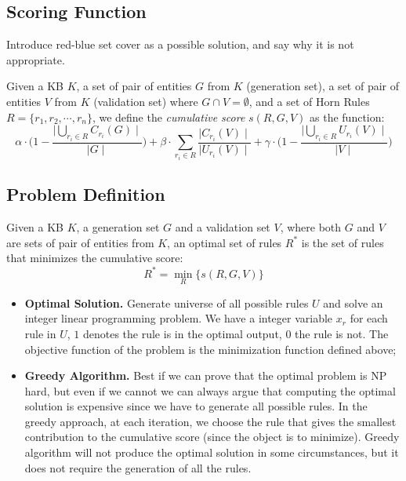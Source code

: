 \subsection{Scoring Function}

{\color{red} Introduce red-blue set cover as a possible solution, and
	say why it is not appropriate.}

Given a KB $K$, a set of pair of entities $G$ from $K$ (generation set), a set of pair of entities $V$ from $K$ (validation set) where $G \cap V = \emptyset$, and a set of Horn Rules $R=\{r_1,r_2,\cdots,r_n\}$, we define the \emph{cumulative score} $s(R,G,V)$ as the function:
\begin{equation*}
	\alpha \cdot \bigg(1-\frac{\mid\bigcup\limits_{r_i \in R} C_{r_i}(G)\mid}{\mid G \mid}\bigg) +\beta \cdot \sum_{r_i \in R}\frac{\mid C_{r_i}(V) \mid}{\mid U_{r_i}(V)\mid}  +\gamma \cdot \bigg(1-\frac{\mid\bigcup\limits_{r_i \in R} U_{r_i}(V)\mid}{\mid V \mid}\bigg)
\end{equation*}


\subsection{Problem Definition}
Given a KB $K$, a generation set $G$ and a validation set $V$, where both $G$ and $V$ are sets of pair of entities from $K$, an optimal set of rules $R^*$ is the set of rules that minimizes the cumulative score:
\begin{equation*}
R^* = \min\limits_{R}\{s(R,G,V)\}
\end{equation*}
\begin{itemize}
\item \textbf{Optimal Solution.} Generate universe of all possible rules $U$ and solve an integer linear programming problem. We have a integer variable $x_r$ for each rule in $U$, $1$ denotes the rule is in the optimal output, $0$ the rule is not. The objective function of the problem is the minimization function defined above;
\item \textbf{Greedy Algorithm.} Best if we can prove that the optimal problem is NP hard, but even if we cannot we can always argue that computing the optimal solution is expensive since we have to generate all possible rules. In the greedy approach, at each iteration, we choose the rule that gives the smallest contribution to the cumulative score (since the object is to minimize). Greedy algorithm will not produce the optimal solution in some circumstances, but it does not require the generation of all the rules.
\end{itemize}

